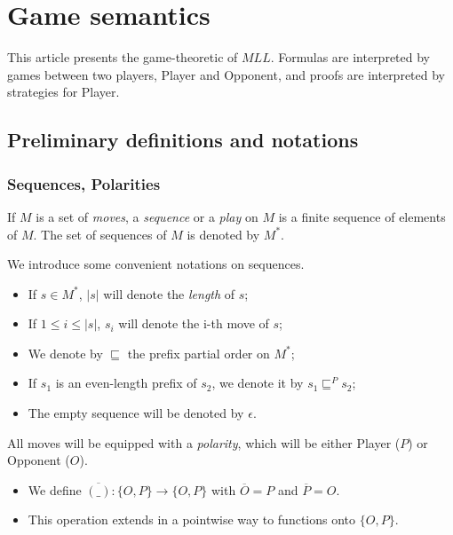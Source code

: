 \chapter{Game semantics}\label{game-semantics}

This article presents the game-theoretic  of \(MLL\). Formulas
are interpreted by games between two players, Player and Opponent, and
proofs are interpreted by strategies for Player.

\section{Preliminary definitions and notations}\label{preliminary-definitions-and-notations}

\subsection{Sequences, Polarities}\label{sequences-polarities}

\begin{definition}[Sequences]
If $M$ is a set of \emph{moves}, a \emph{sequence} or a \emph{play} on $M$ is a finite sequence of elements of $M$. The set of sequences of $M$ is denoted by $M^*$.
\end{definition}

We introduce some convenient notations on sequences.
\begin{itemize}
\item If \(s\in M^*\), \(|s|\) will denote the \emph{length} of \(s\);
\item If \(1\leq i\leq |s|\), \(s_i\) will denote the i-th move of \(s\);
\item We denote by \(\sqsubseteq\) the prefix partial order on \(M^*\);
\item If \(s_1\) is an even-length prefix of \(s_2\), we denote it by \(s_1\sqsubseteq^P s_2\);
\item The empty sequence will be denoted by \(\epsilon\).
\end{itemize}

All moves will be equipped with a \emph{polarity}, which will be either Player (\(P\)) or Opponent (\(O\)).

\begin{itemize}
\item We define \(\overline{(\_)}:\{O,P\}\to \{O,P\}\) with \(\overline{O} = P\) and \(\overline{P} = O\).
\item This operation extends in a pointwise way to functions onto \(\{O,P\}\).
\end{itemize}

